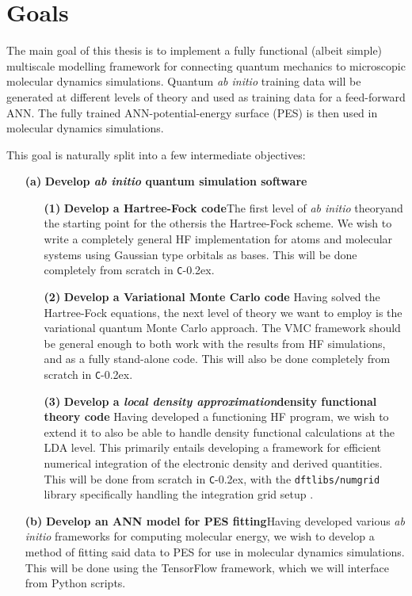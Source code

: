 \documentclass[twoside,english]{uiofysmaster}
\newcommand{\inlinecc}[1]{\lstinline[language={[std]c++}]{#1}}
\newcommand*\CC{\texttt{C}\kern-0.2ex\raisebox{0.2ex}{\scalebox{0.9}{+\kern-0.2ex+}}}
\begin{document}
\section{Goals}
The main goal of this thesis is to implement a fully functional (albeit simple) multiscale modelling framework for connecting quantum mechanics to microscopic molecular dynamics simulations. Quantum \emph{ab initio} training data will be generated at different levels of theory and used as training data for a feed-forward ANN. The fully trained ANN-potential-energy surface (PES) is then used in molecular dynamics simulations. 

This goal is naturally split into a few intermediate objectives:
\begin{itemize}
  \item[{\bf (a)}]{\bf Develop \emph{ab initio} quantum simulation software}
  \begin{itemize}
  \item[{\bf (1)}]{\bf  Develop a Hartree-Fock code}\newline The first level of \emph{ab initio} theory\textemdash and the starting point for the others\textemdash is the Hartree-Fock scheme. We wish to write a completely general HF implementation for atoms and molecular systems using Gaussian type orbitals as bases. This will be done completely from scratch in \CC{}.
  \item[{\bf (2)}] {\bf Develop a Variational Monte Carlo code} \newline Having solved the Hartree-Fock equations, the next level of theory we want to employ is the variational quantum Monte Carlo approach. The VMC framework should be general enough to both work with the results from HF simulations, and as a fully stand-alone code. This will also be done completely from scratch in \CC{}.
  \item[{\bf (3)}]{\bf Develop a \emph{local density approximation}\textemdash density functional theory code} \newline Having developed a functioning HF program, we wish to extend it to also be able to handle density functional calculations at the LDA level. This primarily entails developing a framework for efficient numerical integration of the electronic density and derived quantities. This will be done from scratch in \CC{}, with the \inlinecc{dftlibs/numgrid} library specifically handling the integration grid setup \cite{numgrid}. 
  \end{itemize}
  \item[{\bf (b)}] {\bf Develop an ANN model for PES fitting}\newline Having developed various \emph{ab initio} frameworks for computing molecular energy, we wish to develop a method of fitting said data to PES for use in molecular dynamics simulations. This will be done using the TensorFlow framework, which we will interface from Python scripts.

\end{itemize}
\end{document}
